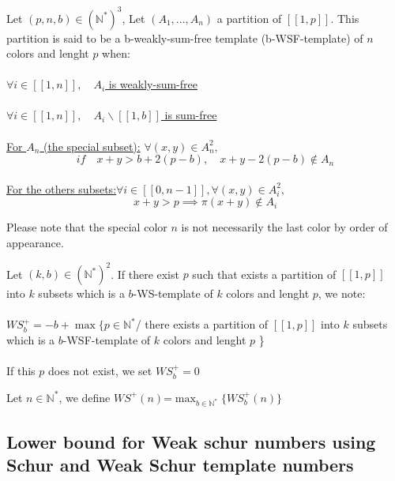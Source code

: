\begin{definition}
Let \( (p,n,b) \in (\mathbb{N}^*)^3\), Let \((A_1,...,A_n)\) a partition of  \([\![1, p]\!]\).
This partition is said to be a b-weakly-sum-free template (b-WSF-template) of \(n\) colors and lenght \(p\) when:
\\\\
\underline{\(\forall i \in [\![1, n]\!], \quad A_i\) is weakly-sum-free}
\\\\
\underline{\(\forall i \in [\![1, n]\!], \quad A_i\backslash [\![1, b]\!]\) is sum-free}
\\\\
\underline{For \(A_n\) (the special subset):} \quad \(\forall (x,y) \in A_n^2,\)
\\
\[if \quad x+y>b+2(p-b),\quad x+y-2(p-b)\notin A_n\]
\\
\underline{For the others subsets:}\quad \(\forall i \in [\![0,n-1]\!], \forall(x,y) \in A_i^2,\)
\\
\[
x+y>p \implies \pi(x+y) \notin A_i
\]
\end{definition}


\begin{remark}
	Please note that the special color \(n\) is not necessarily the last color by order of appearance.
\end{remark}

\begin{definition}
Let \( (k,b) \in (\mathbb{N}^*)^2\). If there exist \(p\) such that exists a partition of \([\![1, p]\!]\) into \(k\)
subsets which is a \(b\)-WS-template of \(k\) colors and lenght \(p\), we note:
\\\\\(WS_b^+=-b+\max \{p\in \mathbb{N}^*\)/ there exists a partition of \([\![1, p]\!]\) into \(k\) subsets which is a
\(b\)-WSF-template of \(k\) colors and lenght \(p\) \}
\\\\
If this \(p\) does not exist, we set \(WS_b^+= 0\)
\end{definition}

\begin{definition}
Let \( n \in \mathbb{N}^*\), we define \(WS^+(n)\)=\(\max_{b\in \mathbb{N}^*} \{WS_b^+(n)\}\)
\end{definition}


\subsection{Lower bound for Weak schur numbers using Schur and Weak Schur template numbers}


